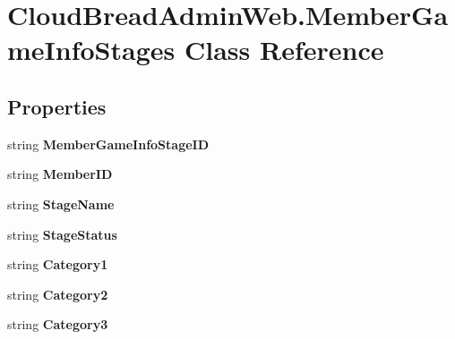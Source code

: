 \hypertarget{a00139}{}\section{Cloud\+Bread\+Admin\+Web.\+Member\+Game\+Info\+Stages Class Reference}
\label{a00139}
\subsection*{Properties}
\begin{DoxyCompactItemize}
\item 
string {\bfseries Member\+Game\+Info\+Stage\+ID}\hypertarget{a00139_ab9031eb532c379930fa610914a7b4041}{}\label{a00139_ab9031eb532c379930fa610914a7b4041}

\item 
string {\bfseries Member\+ID}\hypertarget{a00139_ae56d8768e8b466b39324f0fcb73f10d4}{}\label{a00139_ae56d8768e8b466b39324f0fcb73f10d4}

\item 
string {\bfseries Stage\+Name}\hypertarget{a00139_a08c65bea59ea411455441934031f5f38}{}\label{a00139_a08c65bea59ea411455441934031f5f38}

\item 
string {\bfseries Stage\+Status}\hypertarget{a00139_a872ebd4d56d9312df0d77164cc66a679}{}\label{a00139_a872ebd4d56d9312df0d77164cc66a679}

\item 
string {\bfseries Category1}\hypertarget{a00139_a65437ef048caa43107af1b4a225d466b}{}\label{a00139_a65437ef048caa43107af1b4a225d466b}

\item 
string {\bfseries Category2}\hypertarget{a00139_a2908d9b317bc1be5d6d66c2210684d3b}{}\label{a00139_a2908d9b317bc1be5d6d66c2210684d3b}

\item 
string {\bfseries Category3}\hypertarget{a00139_a54bc4f7f57543638c541a4de085c8d0d}{}\label{a00139_a54bc4f7f57543638c541a4de085c8d0d}


\end{DoxyCompactItemize}
